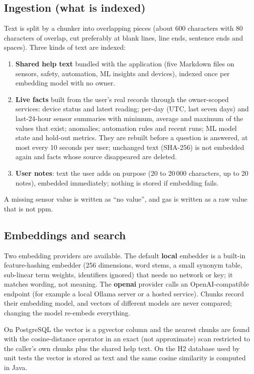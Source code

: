 \documentclass[12pt,a4paper,oneside]{report}
\newcommand{\code}[1]{\texttt{\detokenize{#1}}}
\begin{document}
\subsection{Ingestion (what is indexed)}
Text is split by a chunker into overlapping pieces (about 600 characters with 80 characters of overlap, cut preferably at blank lines, line ends, sentence ends and spaces). Three kinds of text are indexed:
\begin{enumerate}
  \item \textbf{Shared help text} bundled with the application (five Markdown files on sensors, safety, automation, ML insights and devices), indexed once per embedding model with no owner.
  \item \textbf{Live facts} built from the user's real records through the owner-scoped services: device status and latest reading; per-day (UTC, last seven days) and last-24-hour sensor summaries with minimum, average and maximum of the values that exist; anomalies; automation rules and recent runs; ML model state and hold-out metrics. They are rebuilt before a question is answered, at most every 10 seconds per user; unchanged text (SHA-256) is not embedded again and facts whose source disappeared are deleted.
  \item \textbf{User notes}: text the user adds on purpose (20 to 20\,000 characters, up to 20 notes), embedded immediately; nothing is stored if embedding fails.
\end{enumerate}
A missing sensor value is written as ``no value'', and gas is written as a raw value that is not ppm.

\subsection{Embeddings and search}
Two embedding providers are available. The default \textbf{local} embedder is a built-in feature-hashing embedder (256 dimensions, word stems, a small synonym table, sub-linear term weights, identifiers ignored) that needs no network or key; it matches wording, not meaning. The \textbf{openai} provider calls an OpenAI-compatible \code{/embeddings} endpoint (for example a local Ollama server or a hosted service). Chunks record their embedding model, and vectors of different models are never compared; changing the model re-embeds everything.

On PostgreSQL the vector is a pgvector column and the nearest chunks are found with the cosine-distance operator in an exact (not approximate) scan restricted to the caller's own chunks plus the shared help text. On the H2 database used by unit tests the vector is stored as text and the same cosine similarity is computed in Java.
\end{document}
